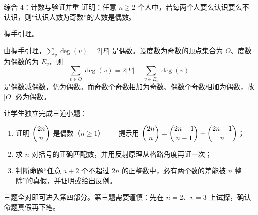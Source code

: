 \begin{problem}{综合 4：计数与验证并重}
证明：任意 $n\ge2$ 个人中，若每两个人要么认识要么不认识，则“认识人数为奇数”的人数是偶数。
\end{problem}
\hint 握手引理。

\sol 由握手引理，$\sum_v\deg(v)=2|E|$ 是偶数。设度数为奇数的顶点集合为 $O$、度数为偶数的为 $E_v$，则
\[
\sum_{v\in O}\deg(v)=2|E|-\sum_{v\in E_v}\deg(v)
\]
是偶数减偶数，仍为偶数。而奇数个奇数相加为奇数、偶数个奇数相加为偶数，故 $|O|$ 必为偶数。

\begin{teach}[第三部分的结课检查]
让学生独立完成三道小题：
\begin{enumerate}
\item 证明 $\dbinom{2n}{n}$ 是偶数（$n\ge1$）——提示用 $\dbinom{2n}{n}=\dbinom{2n-1}{n-1}+\dbinom{2n-1}{n}$；
\item 求 $n$ 对括号的正确匹配数，并用反射原理从格路角度再证一次；
\item 判断命题“任意 $n+2$ 个不超过 $2n$ 的正整数中，必有两个数的差能被 $n$ 整除”的真假，并证明或给出反例。
\end{enumerate}
三题全对即可进入第四部分。第三题需要谨慎：先在 $n=2$、$n=3$ 上试探，确认命题真假再下笔。
\end{teach}
